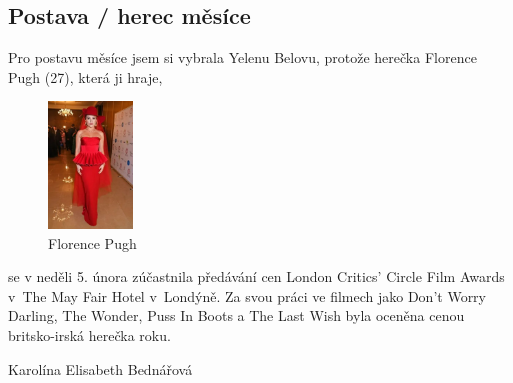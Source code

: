 \documentclass[12pt, a4paper]{article}
\begin{document}
\begin{multicols*}{2}
        \subsection*{Postava / herec měsíce}
        Pro postavu měsíce jsem si vybrala Yelenu Belovu, protože herečka Florence Pugh (27), která ji hraje, 
        \setlength{\intextsep}{0pt}
        \setlength{\columnsep}{12pt}
		\begin{figure}
            \includegraphics[width=0.2\textwidth]{1}
            \caption*{Florence Pugh}
        \end{figure}
        se v neděli 5. února zúčastnila předávání cen London Critics' Circle Film Awards v~The May Fair Hotel v~Londýně. Za svou práci ve filmech jako Don’t Worry Darling, The Wonder, Puss In Boots a The Last Wish byla oceněna cenou britsko-irská herečka roku.
        \begin{flushright}
			\footnotesize 
            Karolína Elisabeth Bednářová
		\end{flushright}



    \end{multicols*}

    
\end{document}

